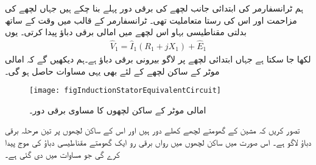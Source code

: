 ہم ٹرانسفارمر کی ابتدائی جانب لچھے کی برقی دور پہلے بنا چکے ہیں جہاں  لچھے کی مزاحمت  اور اس کی رستا متعاملیت   تھی۔ ٹرانسفارمر کے قالب  میں وقت کے ساتھ بدلتی مقناطیسی بہاو اس لچھے میں امالی برقی دباؤ  پیدا کرتی۔ یوں 
\begin{align}
\hat{V}_1=\hat{I}_1 \left(R_1+j X_1 \right) +\hat{E}_1
\end{align}
لکھا جا سکتا ہے  جہاں  ابتدائی لچھے پر لاگو بیرونی برقی دباؤ ہے۔ہم دیکھیں گے کہ امالی موٹر کے ساکن لچھے کے لئے بھی یہی مساوات حاصل ہو گی۔
\begin{figure}
\centering
\texttt{[image: figInductionStatorEquivalentCircuit]}
\caption{امالی موٹر کے ساکن لچھوں کا مساوی برقی دور۔}
\label{شکل_امالی_ساکن_لچھوں_کی_مساوی_دور}
\end{figure}

 تصور کریں کہ مشین کے گھومتے لچھے کھلے دور ہیں اور اس کے ساکن لچھوں پر تین مرحلہ برقی دباؤ لاگو ہے۔ اس صورت میں ساکن لچھوں میں رواں برقی رو ایک گھومتے مقناطیسی دباؤ کی موج   پیدا کرے گی جو مساوات  میں دی گئی ہے۔

